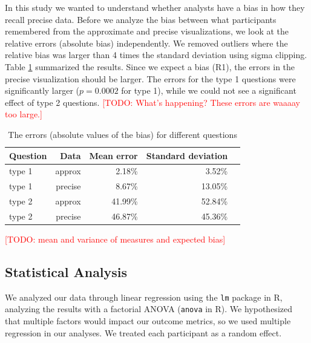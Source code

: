 \documentclass[10pt,journal,compsoc]{IEEEtran}
\newcommand{\note}[2]{\textcolor{#1}{[#2]}}
\newcommand{\todo}[1]{\note{red}{TODO: #1}}
\begin{document}
In this study we wanted to understand whether analysts have a bias in how they recall precise data.
Before we analyze the bias between what participants remembered from the approximate and precise visualizations, we look at the relative errors (absolute bias) independently.
We removed outliers where the relative bias was larger than 4 times the standard deviation using sigma clipping.
Table \ref{table_errors} summarized the results.
Since we expect a bias (R1), the errors in the precise visualization should be larger.
The errors for the type 1 questions were significantly larger ($p=0.0002$ for type 1), while we could not see a significant effect of type 2 questions.  \todo{What's happening? These errors are waaaay too large.}

\begin{table}[!t]
\renewcommand{\arraystretch}{1.3}
\caption{The errors (absolute values of the bias) for different questions}
\label{table_errors}
\centering
\begin{tabular}{|l||r|r|r|r|}
\hline
Question & Data        & Mean error & Standard deviation \\ \hline
\hline
type 1   & approx      & 2.18\%     & 3.52\%             \\ \hline
type 1   & precise     & 8.67\%     & 13.05\%            \\ \hline
type 2   & approx      & 41.99\%    & 52.84\%            \\ \hline
type 2   & precise     & 46.87\%    & 45.36\%            \\ \hline
\end{tabular}
\end{table}

\todo{mean and variance of measures and expected bias}

\subsection{Statistical Analysis}

We analyzed our data through linear regression using the \texttt{lm} package in R, analyzing the results with a factorial ANOVA (\texttt{anova} in R).
We hypothesized that multiple factors would impact our outcome metrics, so we used multiple regression in our analyses.
We treated each participant as a random effect.
\end{document}
